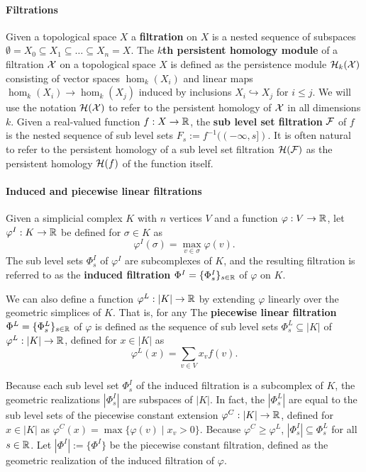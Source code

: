 
\paragraph{Filtrations}

Given a topological space $X$ a \textbf{filtration} on $X$ is a nested sequence of subspaces $\emptyset= X_0\subseteq X_1\subseteq\ldots \subseteq X_n = X$.
The \textbf{$k$th persistent homology module} of a filtration $\mathcal{X}$ on a topological space $X$ is defined as the persistence module $\mathcal{H}_k(\mathcal{X})$ consisting of vector spaces $\hom_k(X_i)$ and linear maps $\hom_k(X_i)\to\hom_k(X_j)$ induced by inclusions $X_i\hookrightarrow X_j$ for $i\leq j$.
We will use the notation $\mathcal{H}(\mathcal{X})$ to refer to the persistent homology of $\mathcal{X}$ in all dimensions $k$.
Given a real-valued function $f: X\to\mathbb{R}$, the \textbf{sub level set filtration} $\mathcal{F}$ of $f$ is the nested sequence of sub level sets $F_s := f^{-1}((-\infty,s])$.
It is often natural to refer to the persistent homology of a sub level set filtration $\mathcal{H}(\mathcal{F})$ as the persistent homology $\mathcal{H}(f)$ of the function itself.

\paragraph{Induced and piecewise linear filtrations}

Given a simplicial complex $K$ with $n$ vertices $V$ and a function $\varphi : V\to\mathbb{R}$, let $\varphi^I : K\to\mathbb{R}$ be defined for $\sigma\in K$ as
\[\varphi^I(\sigma) = \max_{v\in\sigma} \varphi(v).\]
The sub level sets $\Phi^I_s$ of $\varphi^I$ are subcomplexes of $K$, and the resulting filtration is referred to as the \textbf{induced filtration} $\Phi^I = \{\Phi^I_s\}_{s\in\mathbb{R}}$ of $\varphi$ on $K$.

We can also define a function $\varphi^L : |K|\to\mathbb{R}$ by extending $\varphi$ linearly over the geometric simplices of $K$.
That is, for any
The \textbf{piecewise linear filtration} $\Phi^L = \{\Phi^L_s\}_{s\in\mathbb{R}}$ of $\varphi$ is defined as the sequence of sub level sets $\Phi^L_s\subseteq |K|$ of $\varphi^L : |K|\to\mathbb{R}$, defined for $x \in |K|$ as
\[ \varphi^L(x) = \sum_{v\in V} x_v f(v).\]

Because each sub level set $\Phi_s^I$ of the induced filtration is a subcomplex of $K$, the geometric realizations $|\Phi_s^I|$ are subspaces of $|K|$.
In fact, the $|\Phi_s^L|$ are equal to the sub level sets of the piecewise constant extension $\varphi^C : |K|\to \mathbb{R}$, defined for $x\in |K|$ as $\varphi^C(x) = \max\{\varphi(v)\mid x_v > 0\}$.
Because $\varphi^C \geq \varphi^L$, $|\Phi_s^I|\subseteq \Phi_s^L$ for all $s\in\mathbb{R}$.
Let $|\Phi^I| := \{\Phi^I\}$ be the piecewise constant filtration, defined as the geometric realization of the induced filtration of $\varphi$.

